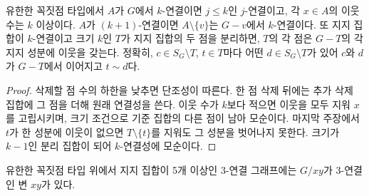 \begin{lemma}
\label{lem:connectivity_tools}
\leanok
유한한 꼭짓점 타입에서 \(A\)가 \(G\)에서 \(k\)-연결이면 \(j \le k\)인 \(j\)-연결이고,
각 \(x \in A\)의 이웃 수는 \(k\) 이상이다. \(A\)가 \((k+1)\)-연결이면 \(A \setminus \{v\}\)는
\(G-v\)에서 \(k\)-연결이다.
또 지지 집합이 \(k\)-연결이고 크기 \(k\)인 \(T\)가 지지 집합의 두 점을 분리하면, \(T\)의 각 점은
\(G-T\)의 각 지지 성분에 이웃을 갖는다. 정확히, \(c \in S_G \setminus T\), \(t \in T\)마다 어떤
\(d \in S_G \setminus T\)가 있어 \(c\)와 \(d\)가 \(G-T\)에서 이어지고 \(t \sim d\)다.
\end{lemma}

\begin{proof}
\leanok
삭제할 점 수의 하한을 낮추면 단조성이 따른다. 한 점 삭제 뒤에는 추가 삭제 집합에 그 점을 더해
원래 연결성을 쓴다. 이웃 수가 \(k\)보다 적으면 이웃을 모두 지워 \(x\)를 고립시키며, 크기 조건으로
기준 집합의 다른 점이 남아 모순이다. 마지막 주장에서 \(t\)가 한 성분에 이웃이 없으면 \(T \setminus \{t\}\)를
지워도 그 성분을 벗어나지 못한다. 크기가 \(k-1\)인 분리 집합이 되어 \(k\)-연결성에 모순이다.
\end{proof}

\begin{theorem}[수축 가능한 변]
\label{thm:contractible}
\leanok
유한한 꼭짓점 타입 위에서 지지 집합이 5개 이상인 3-연결 그래프에는 \(G/xy\)가 3-연결인 변 \(xy\)가 있다.
\end{theorem}

